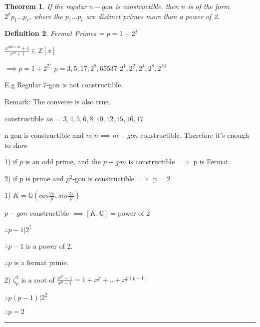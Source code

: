 \documentclass[twoside]{article}
\newcounter{lecnum}
\newcommand{\Z}{\mathbb{Z}}
\newcommand{\Q}{\mathbb{Q}}
\newtheorem{theorem}{Theorem}[lecnum]
\newtheorem{definition}[theorem]{Definition}
\newenvironment{proof}{{\bf Proof:}}{\hfill\rule{2mm}{2mm}}
\newcommand\R{\mathbb{R}}
\begin{document}
    \begin{theorem}
        If the regular $n-gon$ is constructible, then $n$ is of the form $2^kp_1...p_r$, where the $p_1...p_r$ are distinct primes more than a power of 2.
    \end{theorem}

    \begin{definition}
        Fermat Primes = $p = 1 + 2^j$

        $\frac{x^{\text{odd}\times m} + 1}{x^m + 1} \in \Z[x]$
        
        $\implies p = 1 + 2^{2^s}$
        $p = 3,5,17,2^8, 65537$
        $2^1, 2^2, 2^4, 2^8, 2^{16}$
    \end{definition}

    E.g Regular 7-gon is not constructible.

    Remark: The converse is also true. 

    constructible $n$s = $3,4,5,6,8,10,12,15,16,17$

    \begin{proof}
        n-gon is constructible and  $m \vert n \implies m-gon$ constructible. Therefore it's enough to show 

        1) if $p$ is an odd prime, and the $p-gon$ is constructible $\implies$ p is Fermat.

        2) if p is prime and $p^2$-gon is constructible $\implies$ p = 2

        1) $K = \Q (cos \frac{2\pi}{p}, sin \frac{2\pi}{p})$

        $p-gon$ constructible $\implies [K : \Q] = \text{power of 2}$


        $\therefore p-1 \vert 2^{?}$

        $\therefore p-1 $ is a power of 2. 

        $\therefore p$ is a fermat prime.

        2) $\zeta_p^2 $ is a root of $\frac{x^{p^2} - 1}{x^p - 1} = 1 + x^p + .. + x^{p(p-1)}$

    
        $\therefore p(p-1) \vert 2^2$

        $\therefore p = 2$
    \end{proof}
\end{document}
